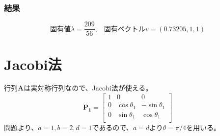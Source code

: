\documentclass[a4j,twoside,openright,11pt]{jsarticle}
\begin{document}
\subsubsection*{結果}
\begin{equation}
固有値\lambda = \frac{209}{56},\;\;\;固有ベクトルv=\left(0.73205,1,1\right)
\end{equation}
\section{Jacobi法}
行列$\bm{A}$は実対称行列なので、Jacobi法が使える。\\
\begin{equation}
\bm{P_1}=
\left[
\begin{array}{ccc}
  1&0&0\\
  0&\cos \theta_1 &-\sin\theta_1\\
  0&\sin \theta_1 &\cos\theta_1\\
\end{array}
\right]
\end{equation}
問題より、$a=1,b=2,d=1$であるので、$a=d$より$\theta=\pi/4$を用いる。
\end{document}
